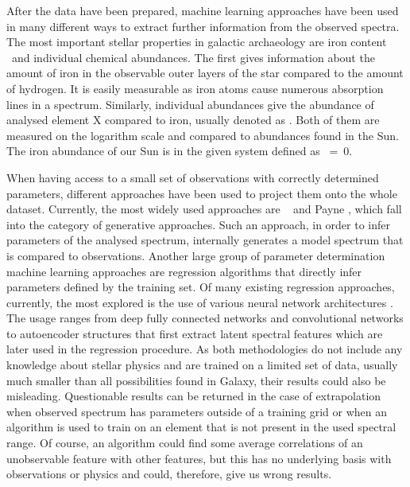 After the data have been prepared, machine learning approaches have been used in many different ways to extract further information from the observed spectra. The most important stellar properties in galactic archaeology are iron content \Feh\ and individual chemical abundances. The first gives information about the amount of iron in the observable outer layers of the star compared to the amount of hydrogen. It is easily measurable as iron atoms cause numerous absorption lines in a spectrum. Similarly, individual abundances give the abundance of analysed element X compared to iron, usually denoted as \Xfe. Both of them are measured on the logarithm scale and compared to abundances found in the Sun. The iron abundance of our Sun is in the given system defined as \Feh~=~0.

When having access to a small set of observations with correctly determined parameters, different approaches have been used to project them onto the whole dataset. Currently, the most widely used approaches are \TC\ \cite{2015ApJ...808...16N, buder2018} and Payne \citep{2019ApJ...879...69T}, which fall into the category of generative approaches. Such an approach, in order to infer parameters of the analysed spectrum, internally generates a model spectrum that is compared to observations. Another large group of parameter determination machine learning approaches are regression algorithms that directly infer parameters defined by the training set. Of many existing regression approaches, currently, the most explored is the use of various neural network architectures \citep{2015MNRAS.452..158Y, 2019MNRAS.483.3255L, 2020ApJ...891...23W, 2020arXiv200208390O}. The usage ranges from deep fully connected networks and convolutional networks to autoencoder structures that first extract latent spectral features which are later used in the regression procedure. As both methodologies do not include any knowledge about stellar physics and are trained on a limited set of data, usually much smaller than all possibilities found in Galaxy, their results could also be misleading. Questionable results can be returned in the case of extrapolation when observed spectrum has parameters outside of a training grid or when an algorithm is used to train on an element that is not present in the used spectral range. Of course, an algorithm could find some average correlations of an unobservable feature with other features, but this has no underlying basis with observations or physics and could, therefore, give us wrong results.

